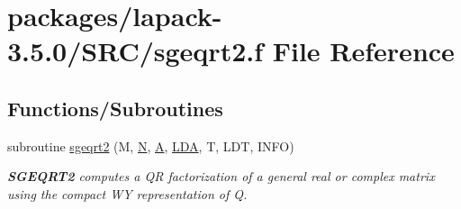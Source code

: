 \hypertarget{sgeqrt2_8f}{}\section{packages/lapack-\/3.5.0/\+S\+R\+C/sgeqrt2.f File Reference}
\label{sgeqrt2_8f}
\subsection*{Functions/\+Subroutines}
\begin{DoxyCompactItemize}
\item 
subroutine \hyperlink{group__realGEcomputational_ga418228a8d0645cee0ff6a89a3b9a8e19}{sgeqrt2} (M, \hyperlink{polmisc_8c_a0240ac851181b84ac374872dc5434ee4}{N}, \hyperlink{classA}{A}, \hyperlink{example__user_8c_ae946da542ce0db94dced19b2ecefd1aa}{L\+D\+A}, T, L\+D\+T, I\+N\+F\+O)
\begin{DoxyCompactList}\small\item\em {\bfseries S\+G\+E\+Q\+R\+T2} computes a Q\+R factorization of a general real or complex matrix using the compact W\+Y representation of Q. \end{DoxyCompactList}\end{DoxyCompactItemize}
